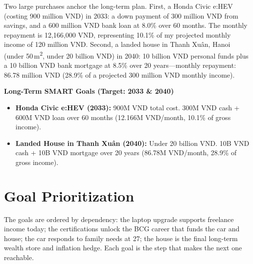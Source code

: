 Two large purchases anchor the long-term plan. First, a Honda Civic e:HEV (costing 900 million VND) in 2033: a down payment of 300 million VND from savings, and a 600 million VND bank loan at 8.0\% over 60 months. The monthly repayment is 12,166,000 VND, representing 10.1\% of my projected monthly income of 120 million VND. Second, a landed house in Thanh Xu\^{a}n, Hanoi (under 50\,m\textsuperscript{2}, under 20 billion VND) in 2040: 10 billion VND personal funds plus a 10 billion VND bank mortgage at 8.5\% over 20 years---monthly repayment: 86.78 million VND (28.9\% of a projected 300 million VND monthly income).

\begin{takeawaybox}
  \textbf{Long-Term SMART Goals (Target: 2033 \& 2040)}
  \begin{itemize}[leftmargin=*]
    \item \textbf{Honda Civic e:HEV (2033):} 900M VND total cost. 300M VND cash + 600M VND loan over 60 months (12.166M VND/month, 10.1\% of gross income).
    \item \textbf{Landed House in Thanh Xuân (2040):} Under 20 billion VND. 10B VND cash + 10B VND mortgage over 20 years (86.78M VND/month, 28.9\% of gross income).
  \end{itemize}
\end{takeawaybox}

\section{Goal Prioritization}

The goals are ordered by dependency: the laptop upgrade supports freelance income today; the certifications unlock the BCG career that funds the car and house; the car responds to family needs at 27; the house is the final long-term wealth store and inflation hedge. Each goal is the step that makes the next one reachable.
